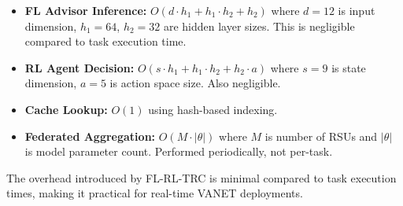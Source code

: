 \begin{itemize}
    \item \textbf{FL Advisor Inference:} $O(d \cdot h_1 + h_1 \cdot h_2 + h_2)$ where $d=12$ is input dimension, $h_1=64$, $h_2=32$ are hidden layer sizes. This is negligible compared to task execution time.
    
    \item \textbf{RL Agent Decision:} $O(s \cdot h_1 + h_1 \cdot h_2 + h_2 \cdot a)$ where $s=9$ is state dimension, $a=5$ is action space size. Also negligible.
    
    \item \textbf{Cache Lookup:} $O(1)$ using hash-based indexing.
    
    \item \textbf{Federated Aggregation:} $O(M \cdot |\theta|)$ where $M$ is number of RSUs and $|\theta|$ is model parameter count. Performed periodically, not per-task.
\end{itemize}

The overhead introduced by FL-RL-TRC is minimal compared to task execution times, making it practical for real-time VANET deployments.
